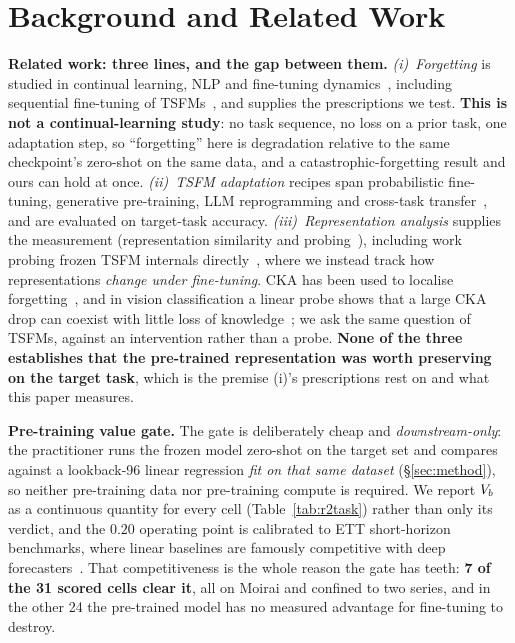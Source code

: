 \section{Background and Related Work}
\label{sec:background}

\textbf{Related work: three lines, and the gap between them.}
\emph{(i)~Forgetting} is studied in continual learning, NLP and fine-tuning
dynamics~\citep{kirkpatrick2017ewc, li2017lwf, luo2023forgetting,
kumar2022finetuning, andreassen2023evolution}, including sequential fine-tuning
of TSFMs~\citep{karaouli2025foundation}, and supplies the prescriptions
we test.  \textbf{This is not a continual-learning study}: no task sequence, no
loss on a prior task, one adaptation step, so ``forgetting'' here is degradation
relative to the same checkpoint's zero-shot on the same data, and a
catastrophic-forgetting result and ours can hold at once.
\emph{(ii)~TSFM adaptation} recipes span probabilistic
fine-tuning, generative pre-training, LLM reprogramming and cross-task
transfer~\citep{rasul2024lagllama, liu2024timer, jin2024timellm,
zhou2023onefitsall}, and are evaluated on target-task accuracy.
\emph{(iii)~Representation analysis} supplies the measurement (representation
similarity and probing~\citep{kornblith2019cka, hewitt2019structural,
pimentel2020information}), including work probing frozen TSFM internals
directly~\citep{wilinski2025representations}, where we instead track how
representations \emph{change under fine-tuning}.  CKA has been used to localise
forgetting~\citep{ramasesh2021anatomy}, and in vision classification a linear
probe shows that a large CKA drop can coexist with little loss of
knowledge~\citep{davari2022probing}; we ask the same question of TSFMs, against an
intervention rather than a probe.  \textbf{None of the three
establishes that the pre-trained representation was worth preserving on the
target task}, which is the premise (i)'s prescriptions rest on and what this
paper measures.

\textbf{Pre-training value gate.}
The gate is deliberately cheap and \emph{downstream-only}: the practitioner
runs the frozen model zero-shot on the target set and compares against a
lookback-96 linear regression \emph{fit on that same dataset}
(\S\ref{sec:method}), so neither pre-training data nor pre-training compute is
required.  We report $V_{b}$ as a continuous quantity for every cell
(Table~\ref{tab:r2task}) rather than only its verdict, and the $0.20$ operating
point is calibrated to ETT short-horizon benchmarks, where linear
baselines are famously competitive with deep
forecasters~\citep{zeng2023transformers}.  That competitiveness is the whole
reason the gate has teeth: \textbf{7 of the 31 scored cells clear it}, all on
Moirai and confined to two series, and in the other 24 the pre-trained model
has no measured advantage for fine-tuning to destroy.

